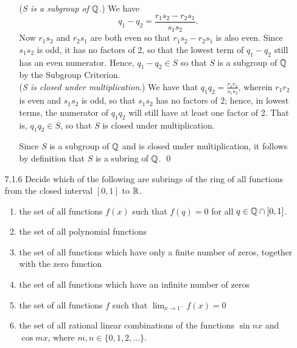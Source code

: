 \begin{enumerate}
\begin{enumerate}
               (\textit{S is a subgroup of $\mathbb{Q}$}.) We have
               $$q_1 - q_2 = \frac{r_1s_2 - r_2s_1}{s_1s_2}.$$
               Now $r_1s_2$ and $r_2s_1$ are both even so that $r_1s_2 - r_2s_1$
               is also even. Since $s_1s_2$ is odd, it has no factors of 2, so
               that the lowest term of $q_1 - q_2$ still has an even numerator.
               Hence, $q_1 - q_2 \in S$ so that $S$ is a subgroup of $\mathbb{Q}$ by the
               Subgroup Criterion. \\

               (\textit{S is closed under multiplication}.) We have that
               $q_1q_2 = \frac{r_1r_2}{s_1s_2}$, wherein $r_1r_2$ is even and
               $s_1s_2$ is odd, so that $s_1s_2$ has no factors of 2; hence, in
               lowest terms, the numerator of $q_1q_2$ will still have at least
               one factor of 2. That is, $q_1q_2 \in S$, so that $S$ is closed
               under multiplication.
            
               Since $S$ is a subgroup of $\mathbb{Q}$ and is closed under
               multiplication, it follows by definition that $S$ is a subring of 
               $\mathbb{Q}$. \qed
      \end{enumerate}
   \item[7.1.6]   Decide which of the following are subrings of the ring of all
                  functions from the closed interval $[0,1]$ to $\mathbb{R}$.
                  \begin{enumerate}
                     \item the set of all functions $f(x)$ such that $f(q) = 0$
                           for all $q \in \mathbb{Q} \cap [0, 1]$.
                     \item the set of all polynomial functions
                     \item the set of all functions which have only a finite
                           number of zeros, together with the zero function
                     \item the set of all functions which have an infinite
                           number of zeros
                     \item the set of all functions $f$ such that
                           $\lim_{x\rightarrow1^-}f(x) = 0$
                     \item the set of all rational linear combinations of the
                           functions $\sin nx$ and $\cos mx$, where
                           $m, n \in \{0, 1, 2, \ldots \}$.
                  \end{enumerate}


\end{enumerate}
